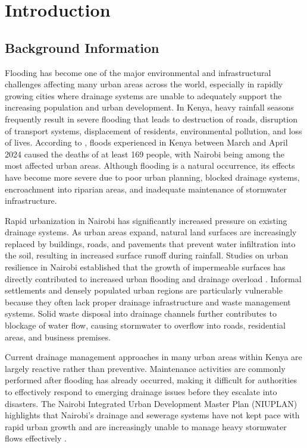 \documentclass[12pt, a4paper]{article}
\begin{document}
\section{Introduction}
\subsection{Background Information}

Flooding has become one of the major environmental and infrastructural challenges affecting many urban areas across the world, especially in rapidly growing cities where drainage systems are unable to adequately support the increasing population and urban development. In Kenya, heavy rainfall seasons frequently result in severe flooding that leads to destruction of roads, disruption of transport systems, displacement of residents, environmental pollution, and loss of lives. According to \citet{avery2024}, floods experienced in Kenya between March and April 2024 caused the deaths of at least 169 people, with Nairobi being among the most affected urban areas. Although flooding is a natural occurrence, its effects have become more severe due to poor urban planning, blocked drainage systems, encroachment into riparian areas, and inadequate maintenance of stormwater infrastructure.

Rapid urbanization in Nairobi has significantly increased pressure on existing drainage systems. As urban areas expand, natural land surfaces are increasingly replaced by buildings, roads, and pavements that prevent water infiltration into the soil, resulting in increased surface runoff during rainfall. Studies on urban resilience in Nairobi established that the growth of impermeable surfaces has directly contributed to increased urban flooding and drainage overload \citep{nyamumbo2025}. Informal settlements and densely populated urban regions are particularly vulnerable because they often lack proper drainage infrastructure and waste management systems. Solid waste disposal into drainage channels further contributes to blockage of water flow, causing stormwater to overflow into roads, residential areas, and business premises.

Current drainage management approaches in many urban areas within Kenya are largely reactive rather than preventive. Maintenance activities are commonly performed after flooding has already occurred, making it difficult for authorities to effectively respond to emerging drainage issues before they escalate into disasters. The Nairobi Integrated Urban Development Master Plan (NIUPLAN) highlights that Nairobi’s drainage and sewerage systems have not kept pace with rapid urban growth and are increasingly unable to manage heavy stormwater flows effectively \citep{jica2014}.
\clearpage
\end{document}
